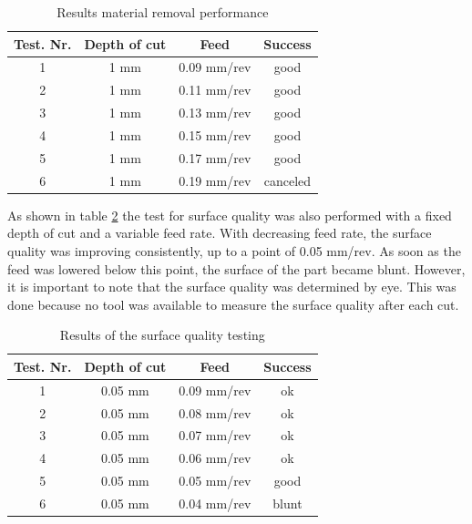 \begin{table}
    \centering
     \begin{tabular}{||c|c|c|c||}
        \hline
        Test. Nr. & Depth of cut & Feed & Success\\ [0.5ex]
        \hline\hline
        1 & 1 mm      & 0.09 mm/rev      & good      \\
        2 & 1 mm      & 0.11 mm/rev      & good      \\
        3 & 1 mm      & 0.13 mm/rev      & good      \\
        4 & 1 mm      & 0.15 mm/rev      & good      \\
        5 & 1 mm      & 0.17 mm/rev      & good      \\
        6 & 1 mm      & 0.19 mm/rev      & canceled  \\[1ex]
        \hline
     \end{tabular}
     \caption{Results material removal performance}
     \label{Tab material removal performance}
\end{table}
 
As shown in table \ref{Tab surface quality testing} the test for surface quality was also performed with a fixed depth of cut and a variable feed rate. With decreasing feed rate, the surface quality was improving consistently, up to a point of 0.05 mm/rev. As soon as the feed was lowered below this point, the surface of the part became blunt. However, it is important to note that the surface quality was determined by eye. This was done because no tool was available to measure the surface quality after each cut.
 
\begin{table}
    \centering
     \begin{tabular}{||c|c|c|c||}
        \hline
        Test. Nr. & Depth of cut & Feed & Success\\ [0.5ex]
        \hline\hline
        1 & 0.05 mm      & 0.09 mm/rev      & ok      \\
        2 & 0.05 mm      & 0.08 mm/rev      & ok      \\
        3 & 0.05 mm      & 0.07 mm/rev      & ok      \\
        4 & 0.05 mm      & 0.06 mm/rev      & ok      \\
        5 & 0.05 mm      & 0.05 mm/rev      & good    \\
        6 & 0.05 mm      & 0.04 mm/rev      & blunt  \\[1ex]
        \hline
     \end{tabular}
     \caption{Results of the surface quality testing}
     \label{Tab surface quality testing}
\end{table}
 
